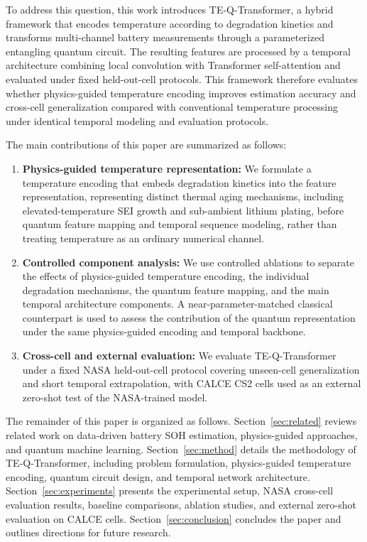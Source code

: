 \documentclass[a4paper,fleqn]{cas-sc}
\begin{document}
To address this question, this work introduces TE-Q-Transformer, a hybrid framework that encodes temperature according to degradation kinetics and transforms multi-channel battery measurements through a parameterized entangling quantum circuit. The resulting features are processed by a temporal architecture combining local convolution with Transformer self-attention and evaluated under fixed held-out-cell protocols. This framework therefore evaluates whether physics-guided temperature encoding improves estimation accuracy and cross-cell generalization compared with conventional temperature processing under identical temporal modeling and evaluation protocols.

The main contributions of this paper are summarized as follows:
\begin{enumerate}[label=(\roman*)]
\item \textbf{Physics-guided temperature representation:} We formulate a temperature encoding that embeds degradation kinetics into the feature representation, representing distinct thermal aging mechanisms, including elevated-temperature SEI growth and sub-ambient lithium plating, before quantum feature mapping and temporal sequence modeling, rather than treating temperature as an ordinary numerical channel.
\item \textbf{Controlled component analysis:} We use controlled ablations to separate the effects of physics-guided temperature encoding, the individual degradation mechanisms, the quantum feature mapping, and the main temporal architecture components. A near-parameter-matched classical counterpart is used to assess the contribution of the quantum representation under the same physics-guided encoding and temporal backbone.
\item \textbf{Cross-cell and external evaluation:} We evaluate TE-Q-Transformer under a fixed NASA held-out-cell protocol covering unseen-cell generalization and short temporal extrapolation, with CALCE CS2 cells used as an external zero-shot test of the NASA-trained model.
\end{enumerate}

The remainder of this paper is organized as follows. Section~\ref{sec:related} reviews related work on data-driven battery SOH estimation, physics-guided approaches, and quantum machine learning. Section~\ref{sec:method} details the methodology of TE-Q-Transformer, including problem formulation, physics-guided temperature encoding, quantum circuit design, and temporal network architecture. Section~\ref{sec:experiments} presents the experimental setup, NASA cross-cell evaluation results, baseline comparisons, ablation studies, and external zero-shot evaluation on CALCE cells. Section~\ref{sec:conclusion} concludes the paper and outlines directions for future research.
\end{document}
